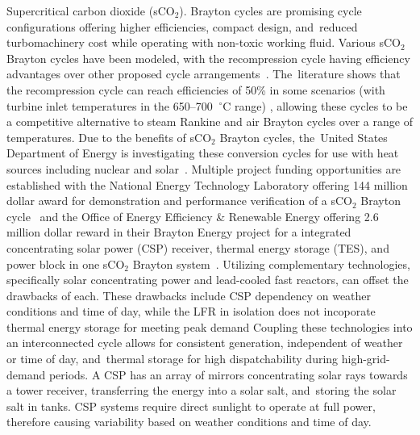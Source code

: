 \documentclass[sustainability,article,accept,moreauthors,pdftex]{Definitions/mdpi}
\begin{document}
{Supercritical carbon dioxide (sCO$_2$).}
Brayton cycles are promising cycle configurations offering higher efficiencies, compact design, and~reduced turbomachinery cost while operating with non-toxic working fluid. Various sCO$_2$ Brayton cycles have been modeled, with the recompression cycle having efficiency advantages over other proposed cycle arrangements~\cite{turchi_2013,ahn_2014,wang_2018}. The~literature shows that the recompression cycle can reach efficiencies of 50\% in some scenarios (with turbine inlet temperatures in the 650--700 $~^{\circ}$C range) \cite{turchi_2013,wright_2009}, allowing these cycles to be a competitive alternative to steam Rankine and air Brayton cycles over a range of temperatures. Due to the benefits of sCO$_2$ Brayton cycles, the~United States Department of Energy is investigating these conversion cycles for use with heat sources including nuclear and solar~\cite{doe_2012}. Multiple project funding opportunities are established with the National Energy Technology Laboratory offering 144 million dollar award for demonstration and performance verification of a sCO$_2$ Brayton cycle~\cite{netl_2016} and the Office of Energy Efficiency \& Renewable Energy offering 2.6 million dollar reward in their Brayton Energy project for a integrated %
{concentrating solar power (CSP) receiver, thermal energy storage (TES),}
and power block in one sCO$_2$ Brayton system~\cite{seto_2015}. Utilizing complementary technologies, specifically solar concentrating power and lead-cooled fast reactors, can offset the drawbacks of each. %
{These drawbacks include CSP dependency on weather conditions and time of day, while the LFR in isolation does not incoporate thermal energy storage for meeting peak demand}
Coupling these technologies into an interconnected cycle allows for consistent generation, independent of weather or time of day, and~thermal storage for high dispatchability during high-grid-demand periods. 
A CSP has an array of mirrors concentrating solar rays towards a %
{tower receiver, transferring the energy into a solar salt, and~storing the solar salt in tanks. CSP systems require direct sunlight to operate at full power, therefore causing variability based on weather conditions and time of day.}
\end{document}
